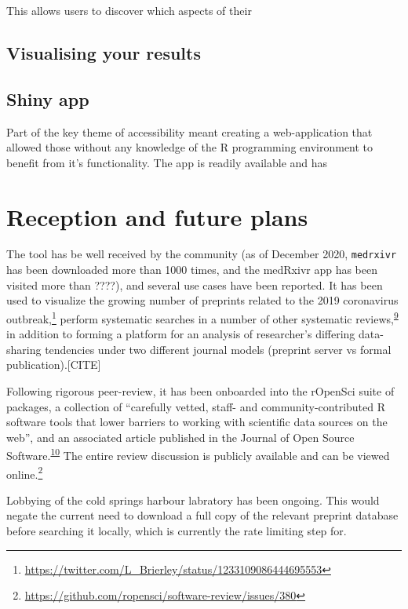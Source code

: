\documentclass[a4paper, twoside]{templates/ociamthesis}
\begin{document}
This allows users to discover which aspects of their

\hypertarget{visualising-your-results}{%
\subsection{Visualising your results}\label{visualising-your-results}}

\hypertarget{shiny-app}{%
\subsection{Shiny app}\label{shiny-app}}

Part of the key theme of accessibility meant creating a web-application that allowed those without any knowledge of the R programming environment to benefit from it's functionality.
The app is readily available and has

\hypertarget{reception-and-future-plans}{%
\section{Reception and future plans}\label{reception-and-future-plans}}

The tool has be well received by the community (as of December 2020, \texttt{medrxivr} has been downloaded more than 1000 times, and the medRxivr app has been visited more than ????), and several use cases have been reported. It has been used to visualize the growing number of preprints related to the 2019 coronavirus outbreak,\footnote{\url{https://twitter.com/L_Brierley/status/1233109086444695553}} perform systematic searches in a number of other systematic reviews,\textsuperscript{\protect\hyperlink{ref-noone2020}{9}} in addition to forming a platform for an analysis of researcher's differing data-sharing tendencies under two different journal models (preprint server vs formal publication).{[}CITE{]}

Following rigorous peer-review, it has been onboarded into the rOpenSci suite of packages, a collection of ``carefully vetted, staff- and community-contributed R software tools that lower barriers to working with scientific data sources on the web'', and an associated article published in the Journal of Open Source Software.\textsuperscript{\protect\hyperlink{ref-mcguinness2020a}{10}} The entire review discussion is publicly available and can be viewed online.\footnote{\url{https://github.com/ropensci/software-review/issues/380}}

Lobbying of the cold springs harbour labratory has been ongoing. This would negate the current need to download a full copy of the relevant preprint database before searching it locally, which is currently the rate limiting step for.
\end{document}

